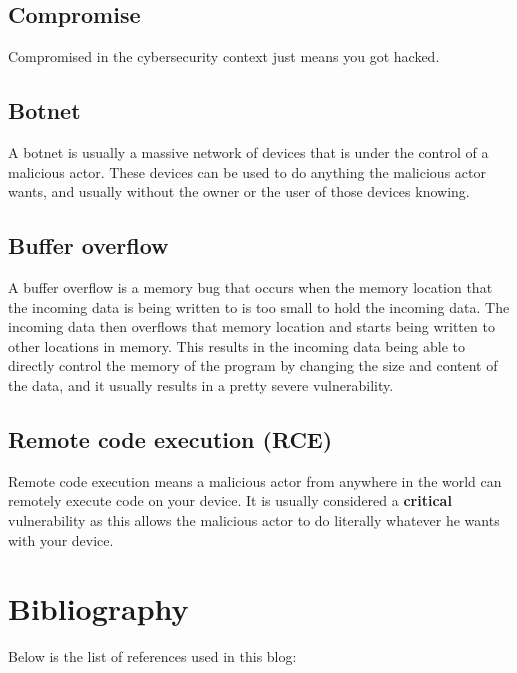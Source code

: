 \documentclass[11pt]{article}
\begin{document}
\subsection{Compromise}
\label{sec:orgcc15205}
Compromised in the cybersecurity context just means
you got hacked.

\subsection{Botnet}
\label{sec:orga66d3a2}
A botnet is usually a massive network of devices
that is under the control of a malicious actor.
These devices can be used to do anything the
malicious actor wants, and usually without the
owner or the user of those devices knowing.

\subsection{Buffer overflow}
\label{sec:orgfceda3d}
A buffer overflow is a memory bug that occurs when
the memory location that the incoming data is being
written to is too small to hold the incoming data.
The incoming data then overflows that memory location
and starts being written to other locations in memory.
This results in the incoming data being able to
directly control the memory of the program by
changing the size and content of the data, and
it usually results in a pretty severe vulnerability.

\subsection{Remote code execution (RCE)}
\label{sec:org490dffc}
Remote code execution means a malicious actor from
anywhere in the world can remotely execute
code on your device. It is usually considered
a \textbf{critical} vulnerability as this allows the
malicious actor to do literally whatever he wants
with your device.

 \newpage

\section{Bibliography}
\label{sec:org699e259}
Below is the list of references used in this blog:  \\
\end{document}
